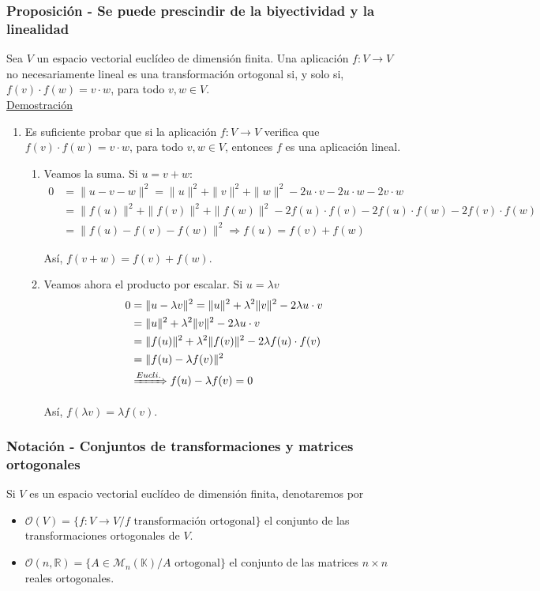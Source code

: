 \documentclass[12pt, a4paper, ones, notitlepage, openany,titlepage]{article}
\newcommand{\demostracion}{\noindent\underline{Demostración}}
\begin{document}
\subsubsection{Proposición - Se puede prescindir de la biyectividad y la linealidad}
Sea $V$ un espacio vectorial euclídeo de dimensión finita. Una aplicación $f: V \rightarrow V$ no necesariamente lineal es una transformación ortogonal si, y solo si, $f(v) \cdot f(w)=v \cdot w$, para todo $v, w \in V$.\\

\demostracion
\begin{enumerate}[label=$\Longleftarrow/$]
	\item Es suficiente probar que si la aplicación $f: V \rightarrow V$ verifica que $f(v) \cdot f(w)=v \cdot w$, para todo $v, w \in V$, entonces $f$ es una aplicación lineal. 
	\begin{enumerate}[label=(\roman*)]
		\item Veamos la suma. Si $u=v+w$:
		$$
		\begin{aligned}
			0 & =\|u-v-w\|^{2}=\|u\|^{2}+\|v\|^{2}+\|w\|^{2}-2 u \cdot v-2 u \cdot w-2 v \cdot w \\
			& =\|f(u)\|^{2}+\|f(v)\|^{2}+\|f(w)\|^{2}-2 f(u) \cdot f(v)-2 f(u) \cdot f(w)-2 f(v) \cdot f(w) \\
			& =\|f(u)-f(v)-f(w)\|^{2} \Longrightarrow f(u) = f(v) + f(w)
		\end{aligned}
		$$
		
		Así, $f(v+w)=f(v)+f(w)$.
		
		\item Veamos ahora el producto por escalar. Si $u=\lambda v$
		$$
		\begin{aligned}
			0 & =\|u-\lambda v\|^{2}=\|u\|^{2}+\lambda^{2}\|v\|^{2}-2 \lambda u \cdot v \\
			& = \|u\|^2 + \lambda^2 \|v\|^2 - 2 \lambda u \cdot v \\
			& =\|f(u)\|^{2}+\lambda^{2}\|f(v)\|^{2}-2 \lambda f(u) \cdot f(v) \\
			& =\|f(u)-\lambda f(v)\|^{2} \\
			& \xRightarrow{Eucli.} f(u) - \lambda f(v) = 0
		\end{aligned}
		$$
		
		Así, $f(\lambda v)=\lambda f(v)$.
	\end{enumerate}
\end{enumerate}

\subsubsection{Notación - Conjuntos de transformaciones y matrices ortogonales}
\noindent Si $V$ es un espacio vectorial euclídeo de dimensión finita, denotaremos por
\begin{itemize}
	\item $\mathcal{O}(V) = \{f: V \rightarrow V / f \text{ transformación ortogonal}\}$ el conjunto de las transformaciones ortogonales de $V$.
	\item $\mathcal{O}(n, \mathbb{R}) = \{A \in \mathcal{M}_n (\mathbb{K}) / A \text{ ortogonal}\}$ el conjunto de las matrices $n \times n$ reales ortogonales.
\end{itemize}
\end{document}
